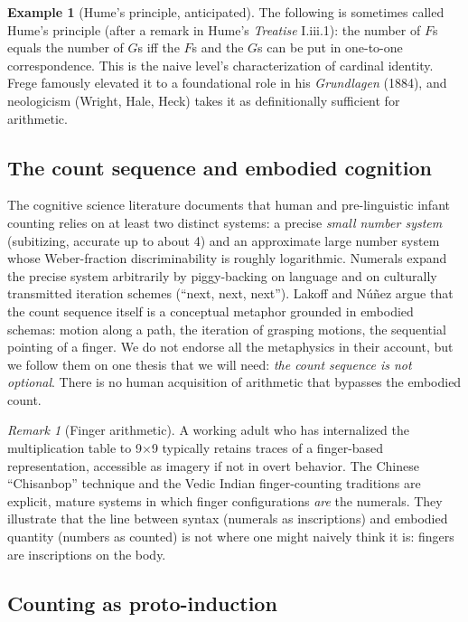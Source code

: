 \documentclass[12pt]{article}
\theoremstyle{definition}
\newtheorem{example}[theorem]{Example}
\theoremstyle{remark}
\newtheorem{remark}[theorem]{Remark}
\begin{document}
\begin{example}[Hume's principle, anticipated]
\label{ex:hume}
The following is sometimes called Hume's principle (after a remark in
Hume's \emph{Treatise} I.iii.1): the number of $F$s equals the number of
$G$s iff the $F$s and the $G$s can be put in one-to-one correspondence.
This is the naive level's characterization of cardinal identity. Frege
famously elevated it to a foundational role in his \emph{Grundlagen}
(1884), and neologicism (Wright, Hale, Heck) takes it as definitionally
sufficient for arithmetic.
\end{example}

\subsection{The count sequence and embodied cognition}

The cognitive science literature documents that human and pre-linguistic
infant counting relies on at least two distinct systems: a precise
\emph{small number system} (subitizing, accurate up to about 4) and an
approximate large number system whose Weber-fraction discriminability is
roughly logarithmic. Numerals expand the precise system arbitrarily by
piggy-backing on language and on culturally transmitted iteration schemes
(``next, next, next''). Lakoff and N\'u\~nez argue that the count sequence
itself is a conceptual metaphor grounded in embodied schemas: motion along
a path, the iteration of grasping motions, the sequential pointing of a
finger. We do not endorse all the metaphysics in their account, but we
follow them on one thesis that we will need: \emph{the count sequence is
not optional}. There is no human acquisition of arithmetic that bypasses
the embodied count.

\begin{remark}[Finger arithmetic]
\label{rem:fingers}
A working adult who has internalized the multiplication table to 9$\times$9
typically retains traces of a finger-based representation, accessible as
imagery if not in overt behavior. The Chinese ``Chisanbop'' technique and
the Vedic Indian finger-counting traditions are explicit, mature systems
in which finger configurations \emph{are} the numerals. They illustrate
that the line between syntax (numerals as inscriptions) and embodied
quantity (numbers as counted) is not where one might naively think it is:
fingers are inscriptions on the body.
\end{remark}

\subsection{Counting as proto-induction}
\end{document}
